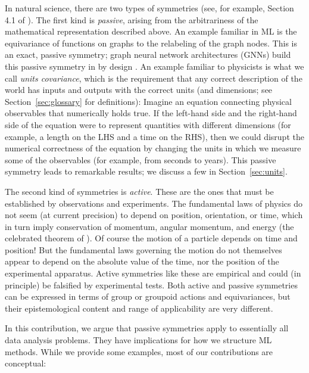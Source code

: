 \documentclass{article} %
\newcommand{\sectionname}{Section}
\newcommand{\secref}[1]{\sectionname~\ref{#1}}
\begin{document}
In natural science, there are two types of symmetries (see, for example, Section 4.1 of \citealt{rovelli2000loop}). 
The first kind is \emph{passive}, arising from the arbitrariness of the mathematical representation described above.
An example familiar in ML is the equivariance of functions on graphs to the relabeling of the graph nodes.
This is an exact, passive symmetry; graph neural network architectures (GNNs) build this passive symmetry in by design \citep{bruna2013spectral, duvenaud2015convolutional, gilmer2017neural}. 
An example familiar to physicists is what we call \emph{units covariance}, which is the requirement that any correct description of the world has inputs and outputs with the correct units (and dimensions; see \secref{sec:glossary} for definitions):
Imagine an equation connecting physical observables that numerically holds true.
If the left-hand side and the right-hand side of the equation were to represent quantities with different dimensions (for example, a length on the LHS and a time on the RHS), then we could disrupt the numerical correctness of the equation by changing the units in which we measure some of the observables (for example, from seconds to years).
This passive symmetry leads to remarkable results; we discuss a few in \secref{sec:units}.

The second kind of symmetries is \emph{active}.
These are the ones that must be established by observations and experiments.
The fundamental laws of physics do not seem (at current precision) to depend on position, orientation, or time, which in turn imply conservation of momentum, angular momentum, and energy (the celebrated theorem of \citealt{noether}).
Of course the motion of a particle depends on time and position! But the fundamental laws governing the motion do not themselves appear to depend on the absolute value of the time, nor the position of the experimental apparatus.
Active symmetries like these are empirical and could (in principle) be falsified by experimental tests.
Both active and passive symmetries can be expressed in terms of group or groupoid actions and equivariances, but their epistemological content and range of applicability are very different. 

In this contribution, we argue that passive symmetries apply to essentially all data analysis problems.
They have implications for how we structure ML methods. While we provide some examples, most of our contributions are conceptual:
\end{document}
